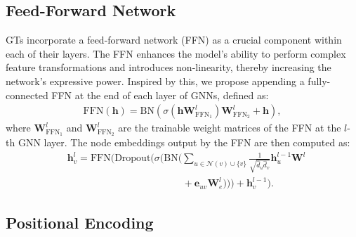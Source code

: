 \subsection{Feed-Forward Network} 
GTs incorporate a feed-forward network (FFN) as a crucial component within each of their layers. The FFN enhances the model's ability to perform complex feature transformations and introduces non-linearity, thereby increasing the network's expressive power. Inspired by this, we propose appending a fully-connected FFN at the end of each layer of GNNs, defined as:
\begin{align}
\text{FFN}(\boldsymbol{h}) = \text{BN}(\sigma(\boldsymbol{h}\boldsymbol{W}_{\text{FFN}_1}^l)\boldsymbol{W}_{\text{FFN}_2}^l + \boldsymbol{h}),
\end{align}
where
$\boldsymbol{W}_{\text{FFN}_1}^l$ and $\boldsymbol{W}_{\text{FFN}_2}^l$ are the trainable weight matrices of the FFN at the $l$-th GNN layer. The node embeddings output by the FFN are then computed as:
\vspace{-0.05 in}
\begin{align}
\nonumber &\boldsymbol{h}_v^l =  \text{FFN}(\text{Dropout}(\sigma(\text{BN}(  \sum_{u \in \mathcal{N}(v) \cup \{v\}} \frac{1}{\sqrt{\hat{d}_u \hat{d}_v}} \boldsymbol{h}_{u}^{l-1}\boldsymbol{W}^l \\  &  ~~~~~~~~~~~~~~~~~~~~~~~~~~~~~~~~~~~~~~~~~~~~~~~~~~~~~ + \boldsymbol{e}_{uv}\boldsymbol{W}^l_e))) + \boldsymbol{h}_{v}^{l-1}). 
\end{align} 
\vspace{-0.3 in}
\subsection{Positional Encoding} 

